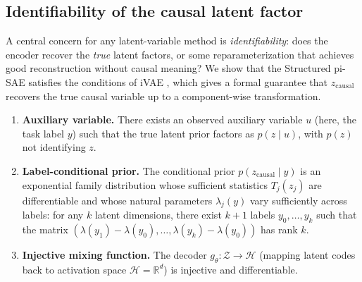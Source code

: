 
\subsection{Identifiability of the causal latent factor}
\label{sec:identifiability}

A central concern for any latent-variable method is \emph{identifiability}: 
does the encoder recover the \emph{true} latent factors, or some 
reparameterization that achieves good reconstruction without causal meaning?
We show that the Structured pi-SAE satisfies the conditions of iVAE
\citep{khemakhem2020variational}, which gives a formal guarantee that 
$z_\text{causal}$ recovers the true causal variable up to a 
component-wise transformation.

\begin{assumption}
\label{ass:ivae}
\leavevmode
\begin{enumerate}[leftmargin=*,label=(\roman*)]
    \item \textbf{Auxiliary variable.} There exists an observed auxiliary
    variable $u$ (here, the task label $y$) such that the true latent prior
    factors as $p(z \mid u)$, with $p(z)$ not identifying $z$.
    \item \textbf{Label-conditional prior.} The conditional prior
    $p(z_\text{causal} \mid y)$ is an exponential family distribution whose
    sufficient statistics $T_j(z_j)$ are differentiable and whose natural
    parameters $\lambda_j(y)$ vary sufficiently across labels: for any
    $k$ latent dimensions, there exist $k+1$ labels $y_0, \ldots, y_k$ such
    that the matrix $(\lambda(y_1) - \lambda(y_0), \ldots,
    \lambda(y_k) - \lambda(y_0))$ has rank $k$.
    \item \textbf{Injective mixing function.} The decoder
    $g_\theta: \mathcal{Z} \to \mathcal{H}$ (mapping latent codes back to
    activation space $\mathcal{H} = \mathbb{R}^d$) is injective and
    differentiable.
\end{enumerate}
\end{assumption}

